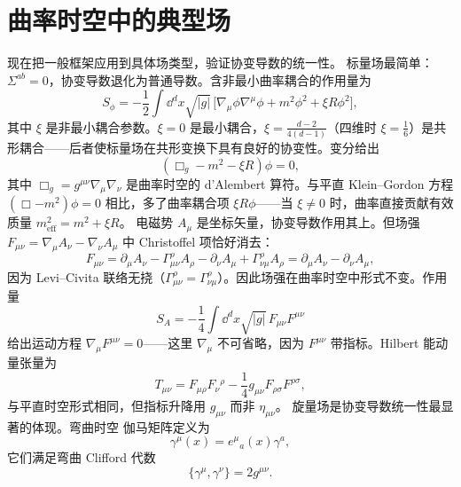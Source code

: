 

\section{曲率时空中的典型场}

现在把一般框架应用到具体场类型，验证协变导数的统一性。
标量场最简单：$\Sigma^{ab}=0$，协变导数退化为普通导数。含非最小曲率耦合的作用量为
\begin{equation}
S_\phi=-\frac{1}{2}\int \dd^dx\sqrt{|g|}\,\big[\nabla_\mu\phi\nabla^\mu\phi+m^2\phi^2+\xi R\phi^2\big],
\end{equation}
其中 $\xi$ 是非最小耦合参数。$\xi=0$ 是最小耦合，$\xi=\frac{d-2}{4(d-1)}$（四维时 $\xi=\frac{1}{6}$）是共形耦合——后者使标量场在共形变换下具有良好的协变性。变分给出
\begin{equation*}{(\Box_g-m^2-\xi R)\phi=0,}
\end{equation*}
其中 $\Box_g=g^{\mu\nu}\nabla_\mu\nabla_\nu$ 是曲率时空的 d'Alembert 算符。与平直 Klein--Gordon 方程 $(\Box-m^2)\phi=0$ 相比，多了曲率耦合项 $\xi R\phi$——当 $\xi\neq0$ 时，曲率直接贡献有效质量 $m_{\text{eff}}^2=m^2+\xi R$。
电磁势 $A_\mu$ 是坐标矢量，协变导数作用其上。但场强 $F_{\mu\nu}=\nabla_\mu A_\nu-\nabla_\nu A_\mu$ 中 Christoffel 项恰好消去：
\begin{equation*}
F_{\mu\nu}=\partial_\mu A_\nu-\Gamma^\rho_{\mu\nu}A_\rho-\partial_\nu A_\mu+\Gamma^\rho_{\nu\mu}A_\rho=\partial_\mu A_\nu-\partial_\nu A_\mu,
\end{equation*}
因为 Levi--Civita 联络无挠（$\Gamma^\rho_{\mu\nu}=\Gamma^\rho_{\nu\mu}$）。因此场强在曲率时空中形式不变。作用量
\begin{equation}
S_A=-\frac{1}{4}\int \dd^dx\sqrt{|g|}\,F_{\mu\nu}F^{\mu\nu}
\end{equation}
给出运动方程 $\nabla_\mu F^{\mu\nu}=0$——这里 $\nabla_\mu$ 不可省略，因为 $F^{\mu\nu}$ 带指标。Hilbert 能动量张量为
\begin{equation}
T_{\mu\nu}=F_{\mu\rho}F_\nu{}^\rho-\frac{1}{4}g_{\mu\nu}F_{\rho\sigma}F^{\rho\sigma},
\end{equation}
与平直时空形式相同，但指标升降用 $g_{\mu\nu}$ 而非 $\eta_{\mu\nu}$。
旋量场是协变导数统一性最显著的体现。弯曲时空 伽马矩阵定义为
\begin{equation}
\gamma^\mu(x)=e^\mu{}_a(x)\gamma^a,
\end{equation}
它们满足弯曲 Clifford 代数
\begin{equation}
\{\gamma^\mu,\gamma^\nu\}=2g^{\mu\nu}.
\end{equation}
